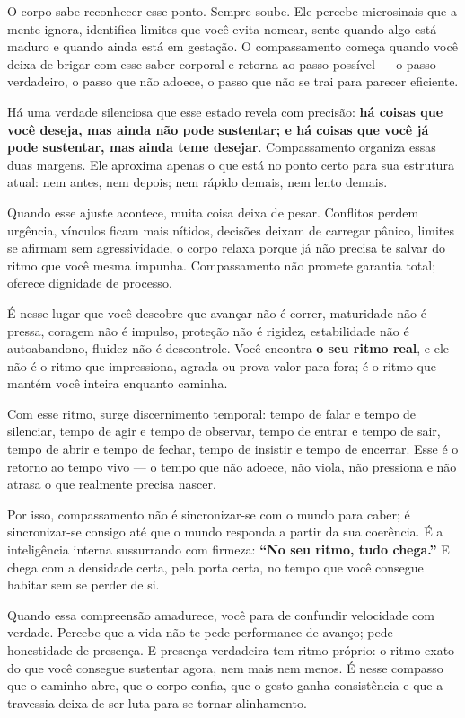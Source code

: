 \documentclass[12pt]{book}
\begin{document}
O corpo sabe reconhecer esse ponto. Sempre soube. Ele percebe microsinais que a mente ignora, identifica limites que você evita nomear, sente quando algo está maduro e quando ainda está em gestação. O compassamento começa quando você deixa de brigar com esse saber corporal e retorna ao passo possível — o passo verdadeiro, o passo que não adoece, o passo que não se trai para parecer eficiente.

Há uma verdade silenciosa que esse estado revela com precisão: \textbf{há coisas que você deseja, mas ainda não pode sustentar; e há coisas que você já pode sustentar, mas ainda teme desejar}. Compassamento organiza essas duas margens. Ele aproxima apenas o que está no ponto certo para sua estrutura atual: nem antes, nem depois; nem rápido demais, nem lento demais.

Quando esse ajuste acontece, muita coisa deixa de pesar. Conflitos perdem urgência, vínculos ficam mais nítidos, decisões deixam de carregar pânico, limites se afirmam sem agressividade, o corpo relaxa porque já não precisa te salvar do ritmo que você mesma impunha. Compassamento não promete garantia total; oferece dignidade de processo.

É nesse lugar que você descobre que avançar não é correr, maturidade não é pressa, coragem não é impulso, proteção não é rigidez, estabilidade não é autoabandono, fluidez não é descontrole. Você encontra \textbf{o seu ritmo real}, e ele não é o ritmo que impressiona, agrada ou prova valor para fora; é o ritmo que mantém você inteira enquanto caminha.

Com esse ritmo, surge discernimento temporal: tempo de falar e tempo de silenciar, tempo de agir e tempo de observar, tempo de entrar e tempo de sair, tempo de abrir e tempo de fechar, tempo de insistir e tempo de encerrar. Esse é o retorno ao tempo vivo — o tempo que não adoece, não viola, não pressiona e não atrasa o que realmente precisa nascer.

Por isso, compassamento não é sincronizar-se com o mundo para caber; é sincronizar-se consigo até que o mundo responda a partir da sua coerência. É a inteligência interna sussurrando com firmeza: \textbf{“No seu ritmo, tudo chega.”} E chega com a densidade certa, pela porta certa, no tempo que você consegue habitar sem se perder de si.

Quando essa compreensão amadurece, você para de confundir velocidade com verdade. Percebe que a vida não te pede performance de avanço; pede honestidade de presença. E presença verdadeira tem ritmo próprio: o ritmo exato do que você consegue sustentar agora, nem mais nem menos. É nesse compasso que o caminho abre, que o corpo confia, que o gesto ganha consistência e que a travessia deixa de ser luta para se tornar alinhamento.
\end{document}
